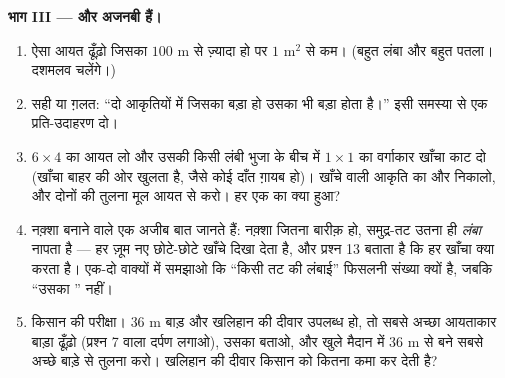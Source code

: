 \begin{problem}
\medskip
\noindent\textbf{भाग III ---  और  अजनबी हैं।}
\begin{enumerate}[resume]
  \item ऐसा आयत ढूँढ़ो जिसका  $100$ m से ज़्यादा हो पर
         $1$ m$^2$ से कम। (बहुत लंबा और बहुत पतला।
        दशमलव चलेंगे।)
  \item सही या ग़लत: ``दो आकृतियों में जिसका  बड़ा हो
        उसका  भी बड़ा होता है।'' इसी समस्या से एक
        प्रति-उदाहरण दो।
  \item $6 \times 4$ का आयत लो और उसकी किसी लंबी भुजा के बीच
        में $1 \times 1$ का वर्गाकार खाँचा काट दो (खाँचा बाहर की
        ओर खुलता है, जैसे कोई दाँत ग़ायब हो)। खाँचे वाली आकृति का
         और  निकालो, और दोनों की तुलना मूल आयत से
        करो। हर एक का क्या हुआ?
  \item नक़्शा बनाने वाले एक अजीब बात जानते हैं: नक़्शा जितना
        बारीक़ हो, समुद्र-तट उतना ही \emph{लंबा} नापता है ---
        हर ज़ूम नए छोटे-छोटे खाँचे दिखा देता है, और प्रश्न 13
        बताता है कि हर खाँचा क्या करता है। एक-दो वाक्यों में
        समझाओ कि ``किसी तट की लंबाई'' फिसलनी संख्या क्यों है,
        जबकि ``उसका '' नहीं।
  \item किसान की परीक्षा। $36$ m बाड़ और खलिहान की दीवार उपलब्ध
        हो, तो सबसे अच्छा आयताकार बाड़ा ढूँढ़ो (प्रश्न 7 वाला
        दर्पण लगाओ), उसका  बताओ, और खुले मैदान में
        $36$ m से बने सबसे अच्छे बाड़े से तुलना करो। खलिहान की
        दीवार किसान को कितना कमा कर देती है?
\end{enumerate}
\end{problem}
